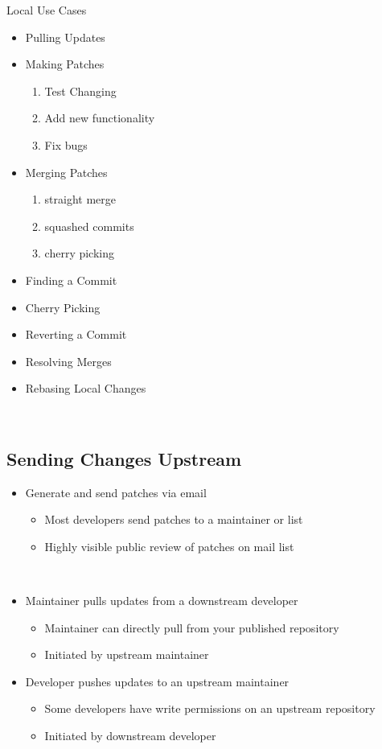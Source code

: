 \documentclass[draftclsnofoot,journal,onecolumn,12pt]{IEEEtran}
\begin{document}
Local Use Cases  
\begin{itemize}
  \item Pulling Updates
  \item Making Patches
  \begin{enumerate}
    \item Test Changing
    \item Add new functionality
    \item Fix bugs
  \end{enumerate}
  \item Merging Patches
  \begin{enumerate}
    \item straight merge
    \item squashed commits
    \item cherry picking
  \end{enumerate}
  \item Finding a Commit
  \item Cherry Picking
  \item Reverting a Commit
  \item Resolving Merges
  \item Rebasing Local Changes
\end{itemize}

\subsection{Sending Changes Upstream}
\begin{itemize}
  \item Generate and send patches via email
  \begin{itemize}
    \item Most developers send patches to a maintainer or list
    \item Highly visible public review of patches on mail list
  \end{itemize}
\item Maintainer pulls updates from a downstream developer
\begin{itemize}
  \item Maintainer can directly pull from your published repository
  \item Initiated by upstream maintainer
\end{itemize}
  \item Developer pushes updates to an upstream maintainer
  \begin{itemize}
  \item Some developers have write permissions on an upstream repository
  \item Initiated by downstream developer
\end{itemize}
\end{itemize}
\end{document}

